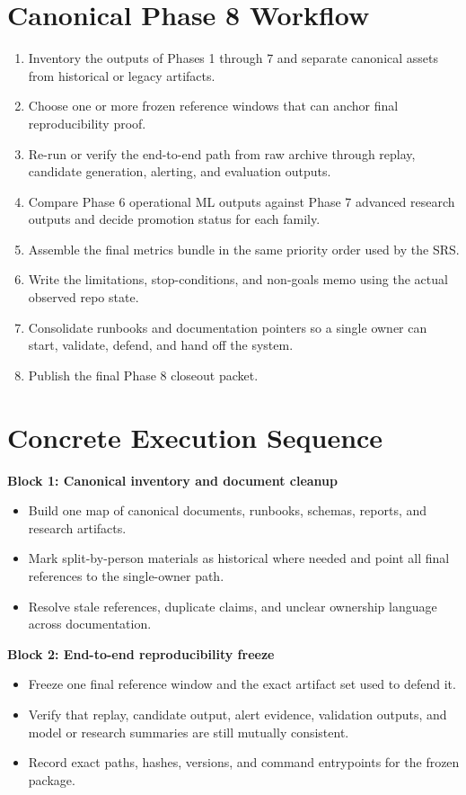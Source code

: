 \documentclass{article}
\begin{document}
\section*{Canonical Phase 8 Workflow}
\begin{enumerate}
\item Inventory the outputs of Phases 1 through 7 and separate canonical assets from historical or legacy artifacts.
\item Choose one or more frozen reference windows that can anchor final reproducibility proof.
\item Re-run or verify the end-to-end path from raw archive through replay, candidate generation, alerting, and evaluation outputs.
\item Compare Phase 6 operational ML outputs against Phase 7 advanced research outputs and decide promotion status for each family.
\item Assemble the final metrics bundle in the same priority order used by the SRS.
\item Write the limitations, stop-conditions, and non-goals memo using the actual observed repo state.
\item Consolidate runbooks and documentation pointers so a single owner can start, validate, defend, and hand off the system.
\item Publish the final Phase 8 closeout packet.
\end{enumerate}

\section*{Concrete Execution Sequence}
\textbf{Block 1: Canonical inventory and document cleanup}
\begin{itemize}
\item Build one map of canonical documents, runbooks, schemas, reports, and research artifacts.
\item Mark split-by-person materials as historical where needed and point all final references to the single-owner path.
\item Resolve stale references, duplicate claims, and unclear ownership language across documentation.
\end{itemize}

\textbf{Block 2: End-to-end reproducibility freeze}
\begin{itemize}
\item Freeze one final reference window and the exact artifact set used to defend it.
\item Verify that replay, candidate output, alert evidence, validation outputs, and model or research summaries are still mutually consistent.
\item Record exact paths, hashes, versions, and command entrypoints for the frozen package.
\end{itemize}
\end{document}
